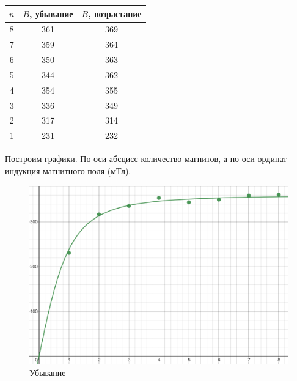 \documentclass[a4paper,12pt]{article} %
\begin{document}
\begin{table}[h!]
	\centering
	\begin{tabular}{|c|c|c|}
		\hline
		$n$ & $B$, убывание & $B$, возрастание \\ \hline
		8   & 361           & 369              \\ \hline
		7   & 359           & 364              \\ \hline
		6   & 350           & 363              \\ \hline
		5   & 344           & 362              \\ \hline
		4   & 354           & 355              \\ \hline
		3   & 336           & 349              \\ \hline
		2   & 317           & 314              \\ \hline
		1   & 231           & 232              \\ \hline
	\end{tabular}
\end{table}

Построим графики. По оси абсцисс количество магнитов, а по оси ординат - индукция магнитного поля (мТл).
\begin{figure}[h!]
	\centering
	\includegraphics[scale=0.7]{Pictures/убыв.png}
	\caption*{Убывание}
\end{figure}
\vspace{15mm}
\end{document}
